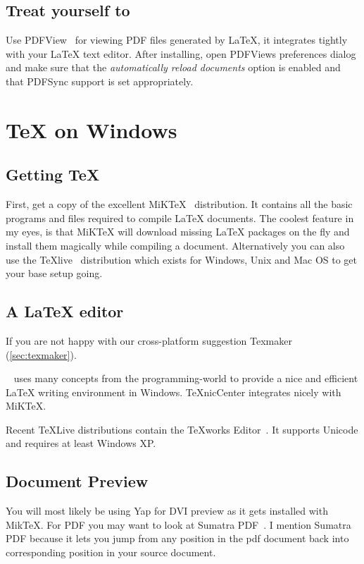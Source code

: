 \subsection{Treat yourself to }

Use PDFView~\cite{pdfview} for viewing PDF files generated by \LaTeX{}, it integrates tightly
with your \LaTeX{} text editor. After installing, open
PDFViews preferences dialog and make sure that the \emph{automatically reload
  documents} option is enabled and that PDFSync support is set appropriately.

\section{\TeX{} on Windows}

\subsection{Getting \TeX{}}

First, get a copy of the excellent MiK\TeX{}~\cite{miktex} distribution.
It contains all the basic programs and files
required to compile \LaTeX{} documents.  The coolest feature in my eyes, is
that MiK\TeX{} will download missing \LaTeX{} packages on the fly and install them
magically while compiling a document. Alternatively you can also use
the TeXlive~\cite{texlive} distribution which exists for Windows, Unix and Mac OS to
get your base setup going.

\subsection{A \LaTeX{} editor}

If you are not happy with our cross-platform suggestion Texmaker
(\autoref{sec:texmaker}).

~\cite{texniccenter} uses many concepts from the programming-world to provide a nice and
efficient \LaTeX{} writing environment in Windows. TeXnicCenter integrates nicely with
MiKTeX.

Recent \TeX{}Live distributions contain the \TeX{}works Editor~\cite{texworks}.
It supports Unicode and requires at least Windows XP\@.

\subsection{Document Preview}

You will most likely be using Yap for DVI preview as it gets installed with
MikTeX. For PDF you may want to look at Sumatra
PDF~\cite{sumatrapdf}. I mention Sumatra PDF
because it lets you jump from any position in the pdf document back into
corresponding position in your source document.

